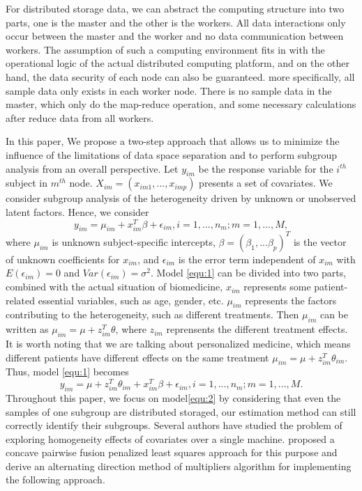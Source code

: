 \documentclass[review]{elsarticle}
\begin{document}
For distributed storage data, we can abstract the computing structure into two parts, one is the master and the other is the workers. All data interactions only occur between the master and the worker and no data communication between workers. The assumption of such a computing environment fits in with the operational logic of the actual distributed computing platform, and on the other hand, the data security of each node can also be guaranteed. more specifically, all sample data only exists in each worker node. There is no sample data in the master, which only do the map-reduce operation, and some necessary calculations after reduce data from all workers.

In this paper, We propose a two-step approach that allows us to minimize the influence of the limitations of data space separation and to perform subgroup analysis from an overall perspective. Let $y_{im}$ be the response variable for the $i^{th}$ subject in $m^{th}$ node. $X_{im}=(x_{im1},...,x_{imp})$ presents a set of covariates. We consider subgroup analysis of the heterogeneity driven by unknown or unobserved latent factors. Hence, we consider
\begin{equation}
y_{im} = \mu_{im} + x_{im}^T\beta + \epsilon_{im}, i=1,...,n_m; m=1,...,M,
\label{equ:1}
\end{equation}
where $\mu_{im}$ is unknown subject-specific intercepts, $\beta = (\beta_1,...\beta_p)^T$ is the vector of unknown coefficients for $x_{im}$, and $\epsilon_{im}$ is the error term independent of $x_{im}$ with $E(\epsilon_{im})=0$ and $Var(\epsilon_{im})=\sigma^2$. Model \ref{equ:1} can be divided into two parts, combined with the actual situation of biomedicine, $x_{im}$ represents some patient-related essential variables, such as age, gender, etc. $\mu_{im}$ represents the factors contributing to the heterogeneity, such as different treatments. Then $\mu_{im}$ can be written as $\mu_{im}=\mu+z_{im}^T\theta$, where $z_{im}$ reprensents the different treatment effects. It is worth noting that we are talking about personalized medicine, which means different patients have different effects on the same treatment $\mu_{im}=\mu+z_{im}^T\theta_{im}$. Thus, model \ref{equ:1} becomes
\begin{equation}
\label{equ:2}
y_{im} = \mu+z_{im}^T\theta_{im} + x_{im}^T\beta + \epsilon_{im}, i=1,...,n_m; m=1,...,M.
\end{equation}
Throughout this paper, we focus on model\ref{equ:2} by considering that even the samples of one subgroup are distributed storaged, our estimation method can still correctly identify their subgroups. Several authors have studied the problem of exploring homogeneity effects of covariates over a single machine. \cite{ma2017concave} proposed a concave pairwise fusion penalized least squares approach for this purpose and derive an alternating direction method of multipliers algorithm \cite{boyd2011distributed} for implementing the following approach.
\end{document}
